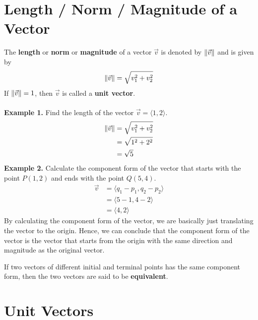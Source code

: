 \section*{Length / Norm / Magnitude of a Vector}

The \textbf{length} or \textbf{norm} or \textbf{magnitude} of a vector
$\vec{v}$ is denoted by $\left\lVert\vec{v}\right\rVert$ and is given by \[\left\lVert\vec{v}\right\rVert = \sqrt{v_1^2 + v_2^2}\]
If $\left\lVert\vec{v}\right\rVert = 1$, then $\vec{v}$ is called a \textbf{unit vector}.\\\\
\noindent\textbf{Example 1. } Find the length of the vector $\vec{v} = \langle
    1, 2 \rangle$.
\begin{align*}
    \left\lVert\vec{v}\right\rVert & = \sqrt{v_1^2 + v_2^2} \\
                   & = \sqrt{1^2 + 2^2}     \\
                   & = \sqrt{5}
\end{align*}
\noindent\textbf{Example 2. } Calculate the component form of the vector that starts with the point $P(1, 2)$ and ends with the point $Q(5, 4)$.
\begin{align*}
    \vec{v} & = \langle q_1 - p_1, q_2 - p_2 \rangle \\
            & = \langle 5 - 1, 4 - 2 \rangle         \\
            & = \langle 4, 2 \rangle
\end{align*}
By calculating the component form of the vector, we are basically just translating the vector to the origin. Hence, we can conclude that the component form of the vector is the vector that starts from the origin with the same direction and magnitude as the original vector.

If two vectors of different initial and terminal points has the same component
form, then the two vectors are said to be \textbf{equivalent}.

\section*{Unit Vectors}


